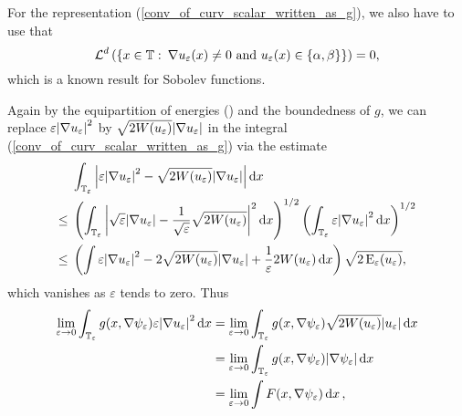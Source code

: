 For the representation (\ref{conv_of_curv_scalar_written_as_g}), we also have 
to use that 
\begin{equation*}
	\operatorname{\mathcal{L}}^{ d } \left(
	\left\{
	x \in \operatorname{\mathbb{T}}
	\, \colon \,
	\nabla u_{ \varepsilon } ( x ) \neq 0 \text{ and } u_{ \varepsilon } ( x ) 
	\in \{ \alpha , \beta \}
	\right\}
	\right)
	=
	0,
\end{equation*}
which is a known result for Sobolev functions.

Again by the equipartition of energies () and 
the boundedness of $ g $, we can replace $ \varepsilon \abs{ \nabla u_{ 
\varepsilon } }^{ 2 } $ by $ \sqrt{ 2 W ( u_{ \varepsilon } ) } \abs{ \nabla 
u_{ \varepsilon } } $ in the integral (\ref{conv_of_curv_scalar_written_as_g}) 
via the estimate
\begin{align*}
	& \int_{ \operatorname{\mathbb{T}}_{ \varepsilon } }
	\abs{ 
		\varepsilon \abs{ \nabla u_{ \varepsilon } }^{ 2 }
		-
		\sqrt{ 2 W ( u_{ \varepsilon } ) } \abs{ \nabla u_{\varepsilon } }
	}
	\dd{ x }
	\\
	\leq {} &
	\left(
	\int_{ \operatorname{\mathbb{T}}_{ \varepsilon } }
	\abs{ 
		\sqrt{ \varepsilon } \abs{ \nabla u_{ \varepsilon } } 
		- 
		\frac{ 1 }{ \sqrt{ \varepsilon } } \sqrt{ 2 W ( u_{ \varepsilon } ) } 
	}^{ 2 }
	\dd{ x }
	\right)^{ 1/2 }
	\left(
	\int_{ \operatorname{\mathbb{T}}_{ \varepsilon } }
	\varepsilon \abs{ \nabla u_{ \varepsilon } }^{ 2 }
	\dd{ x }
	\right)^{ 1/ 2 }
	\\
	\leq {} &
	\left(
	\int
	\varepsilon \abs{ \nabla u_{ \varepsilon } }^{ 2 }
	-
	2 \sqrt{ 2 W ( u_{ \varepsilon } ) } \abs{ \nabla u_{ \varepsilon } }
	+
	\frac{ 1 }{ \varepsilon }
	2 W ( u_{ \varepsilon } )
	\dd{ x }
	\right)
	\sqrt{ 2 \operatorname{E}_{ \varepsilon } ( u_{ \varepsilon } ) },
\end{align*}
which vanishes as $ \varepsilon $ tends to zero.
Thus
\begin{align*}
	\lim_{ \varepsilon \to 0 }
	\int_{ \operatorname{\mathbb{T}}_{ \varepsilon } }
	g ( x , \nabla \psi_{ \varepsilon  } )
	\varepsilon \abs{ \nabla u_{ \varepsilon } }^{ 2 }
	\dd{ x }
	& =
	\lim_{ \varepsilon \to 0 }
	\int_{ \operatorname{\mathbb{T}}_{ \varepsilon } }
	g ( x , \nabla \psi_{ \varepsilon  } )
	\sqrt{ 2 W ( u_{ \varepsilon } ) } 
	\abs{ u_{ \varepsilon } }
	\dd{ x }
	\\
	& =
	\lim_{ \varepsilon \to 0 }
	\int_{ \operatorname{\mathbb{T}}_{ \varepsilon } }
	g ( x , \nabla \psi_{ \varepsilon  } ) \abs{ \nabla \psi_{ \varepsilon  } }
	\dd{ x }
	\\
	& = 
	\lim_{ \varepsilon \to 0 }
	\int
	F ( x, \nabla \psi_{ \varepsilon } )
	\dd{ x },
\end{align*}

